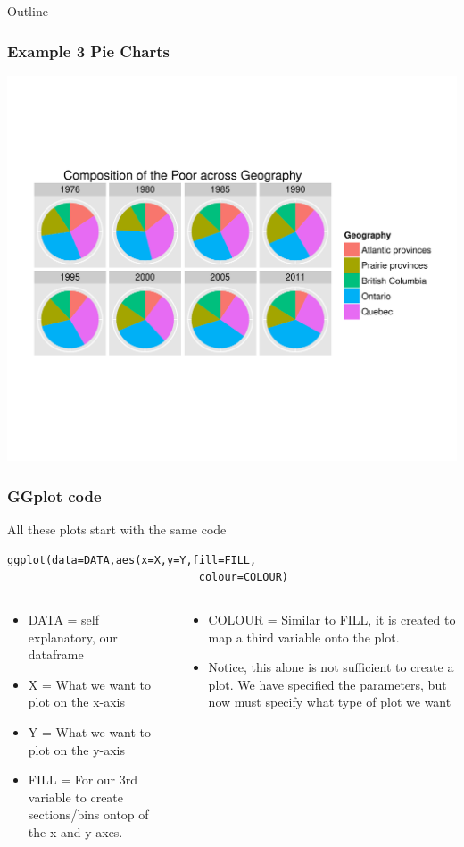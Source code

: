 \documentclass[nogin]{beamer}\usepackage[]{graphicx}\usepackage[]{color}
\makeatletter
\def\maxwidth{ %
  \ifdim\Gin@nat@width>\linewidth
    \linewidth
  \else
    \Gin@nat@width
  \fi
}
\newenvironment{knitrout}{}{} %
\makeatother
\begin{document}
\begin{frame}[fragile]{Outline}
\frametitle{Example 3 Pie Charts}
\begin{knitrout}
\color{fgcolor}
\includegraphics[width=\maxwidth]{figure/unnamed-chunk-3} 

\end{knitrout}

\end{frame}

\begin{frame}[fragile]
\frametitle{GGplot code}
\begin{block}{All these plots start with the same code}
\begin{verbatim}
ggplot(data=DATA,aes(x=X,y=Y,fill=FILL,
                              colour=COLOUR)
\end{verbatim}
\end{block}
\footnotesize
\begin{columns}[T]
\begin{column}{0.5\textwidth}
\begin{itemize}
\item DATA = self explanatory, our dataframe
\item X = What we want to plot on the x-axis
\item Y = What we want to plot on the y-axis
\item FILL = For our 3rd variable to create sections/bins ontop of the x and y axes.
\end{itemize}
\end{column}
\begin{column}{0.5\textwidth}
\begin{itemize}
\item COLOUR = Similar to FILL, it is created to map a third variable onto the plot.
\item Notice, this alone is not sufficient to create a plot. We have specified the parameters, but now must specify what type of plot we want
\end{itemize}
\end{column}
\end{columns}
\end{frame}
\end{document}
